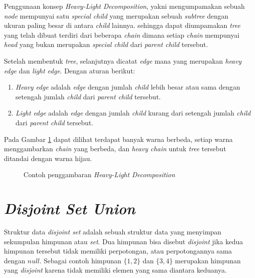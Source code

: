 \quad Penggunaan konsep \textit{Heavy-Light Decomposition}, yakni mengumpamakan sebuah \textit{node} mempunyai satu \textit{special child} yang merupakan sebuah \textit{subtree} dengan ukuran paling besar di antara \textit{child} lainnya. sehingga dapat diumpamakan \textit{tree} yang telah dibuat terdiri dari beberapa \textit{chain} dimana setiap \textit{chain} mempunyai \textit{head} yang bukan merupakan \textit{special child} dari \textit{parent child} tersebut.

\quad Setelah membentuk \textit{tree}, selanjutnya dicatat \textit{edge} mana yang merupakan \textit{heavy edge} dan \textit{light edge}. Dengan aturan berikut:
\begin{enumerate}
	\item \textit{Heavy edge} adalah \textit{edge} dengan jumlah \textit{child} lebih besar atau sama dengan setengah jumlah \textit{child} dari \textit{parent child} tersebut.
	\item \textit{Light edge} adalah \textit{edge} dengan jumlah \textit{child} kurang dari setengah jumlah \textit{child} dari \textit{parent child} tersebut.
\end{enumerate}
\quad Pada Gambar \ref{fig:ht} dapat dilihat terdapat banyak warna berbeda, setiap warna menggambarkan \textit{chain} yang berbeda, dan \textit{heavy chain} untuk \textit{tree} tersebut ditandai dengan warna hijau.
\begin{figure}[H]
\centering
{}
\caption{Contoh penggambaran \textit{Heavy-Light Decomposition}\label{fig:ht}}
\end{figure}

\section{\quad \textit{Disjoint Set Union}}
\quad Struktur data \textit{disjoint set} adalah sebuah struktur data yang menyimpan sekumpulan himpunan atau \textit{set}. Dua himpunan bisa disebut \textit{disjoint} jika kedua himpunan tersebut tidak memiliki perpotongan, atau perpotongannya sama dengan $\textit{null}$. Sebagai contoh himpunan $\{1,2\}$ dan $\{3,4\}$ merupakan himpunan yang \textit{disjoint} karena tidak memiliki elemen yang sama diantara keduanya.

